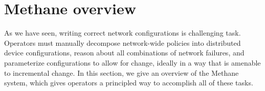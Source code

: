 \documentclass{sig-alternate-10pt}
\newcommand{\sysname}{{\small \sf Methane}\xspace}
\newcommand{\CD}[1]{\texttt{\small #1}}  %
\newcommand{\KW}[1]{\texttt{\small\bfseries{#1}}}
\newcommand{\True}{\CD{true}}
\newcommand{\Define}{\KW{define}}
\newcommand{\Prefer}{\texttt{>>}}
\newcommand{\Path}{\texttt{=>}}
\newcommand{\In}{\KW{in}}
\newcommand{\Exit}{\KW{exit}}
\newcommand{\End}{\KW{end}}
\newcommand{\Always}{\KW{always}}
\begin{document}
%
%
%
%

\section{Methane overview}
\label{sec:overview}

As we have seen, writing correct network configurations is challenging task. Operators must manually decompose network-wide policies into distributed device configurations, reason about all combinations of network failures, and parameterize configurations to allow for change, ideally in a way that is amenable to incremental change. In this section, we give an overview of the \sysname system, which gives operators a principled way to accomplish all of these tasks.




\end{document}
